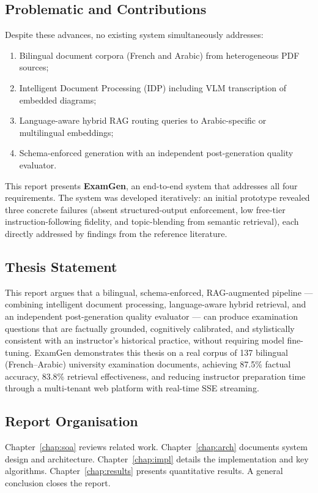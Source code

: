 \subsection*{Problematic and Contributions}

Despite these advances, no existing system simultaneously addresses:
\begin{enumerate}
  \item Bilingual document corpora (French and Arabic) from heterogeneous PDF sources;
  \item Intelligent Document Processing (IDP) including VLM transcription of embedded diagrams;
  \item Language-aware hybrid RAG routing queries to Arabic-specific or multilingual embeddings;
  \item Schema-enforced generation with an independent post-generation quality evaluator.
\end{enumerate}

This report presents \textbf{ExamGen}, an end-to-end system that addresses all four
requirements. The system was developed iteratively: an initial prototype revealed
three concrete failures (absent structured-output enforcement, low free-tier
instruction-following fidelity, and topic-blending from semantic retrieval), each
directly addressed by findings from the reference literature.

\subsection*{Thesis Statement}

This report argues that a bilingual, schema-enforced, RAG-augmented pipeline ---
combining intelligent document processing, language-aware hybrid retrieval, and an
independent post-generation quality evaluator --- can produce examination questions
that are factually grounded, cognitively calibrated, and stylistically consistent
with an instructor's historical practice, without requiring model fine-tuning.
ExamGen demonstrates this thesis on a real corpus of 137 bilingual (French--Arabic)
university examination documents, achieving 87.5\% factual accuracy, 83.8\%
retrieval effectiveness, and reducing instructor preparation time through a
multi-tenant web platform with real-time SSE streaming.

\subsection*{Report Organisation}

Chapter~\ref{chap:soa} reviews related work.
Chapter~\ref{chap:arch} documents system design and architecture.
Chapter~\ref{chap:impl} details the implementation and key algorithms.
Chapter~\ref{chap:results} presents quantitative results.
A general conclusion closes the report.
